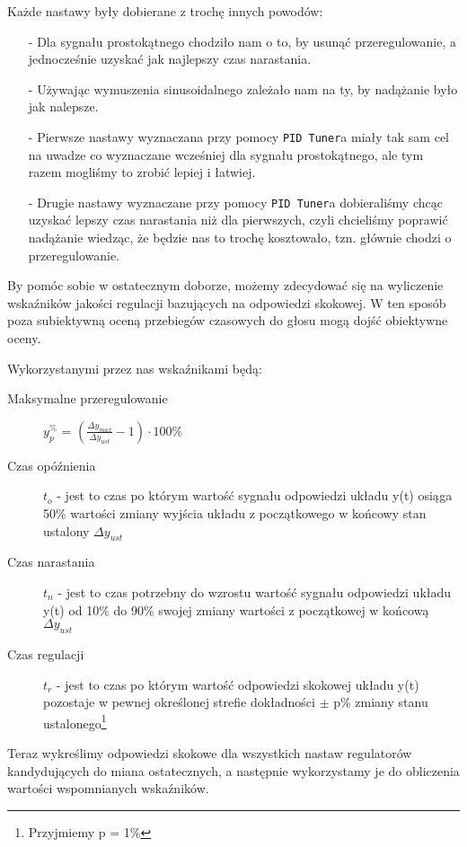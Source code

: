 \documentclass[11 pt]{article}
\begin{document}
Każde nastawy były dobierane z trochę innych powodów:

\begin{itemize}
\item[-] Dla sygnału prostokątnego chodziło nam o to, by usunąć przeregulowanie, a jednocześnie uzyskać jak najlepszy czas narastania.
\item[-] Używając wymuszenia sinusoidalnego zależało nam na ty, by nadążanie było jak nalepsze.
\item[-] Pierwsze nastawy wyznaczana przy pomocy \texttt{PID Tuner}a miały tak sam cel na uwadze co wyznaczane wcześniej dla sygnału prostokątnego, ale tym razem mogliśmy to zrobić lepiej i łatwiej.
\item[-] Drugie nastawy wyznaczane przy pomocy \texttt{PID Tuner}a dobieraliśmy chcąc uzyskać lepszy czas narastania niż dla pierwszych, czyli chcieliśmy poprawić nadążanie wiedząc, że będzie nas to trochę kosztowało, tzn. głównie chodzi o przeregulowanie.
\end{itemize}

By pomóc sobie w ostatecznym doborze, możemy zdecydować się na wyliczenie wskaźników jakości regulacji bazujących na odpowiedzi skokowej. W ten sposób poza subiektywną oceną przebiegów czasowych do głosu mogą dojść obiektywne oceny.

Wykorzystanymi przez nas wskaźnikami będą:

\begin{description}
\item[Maksymalne przeregulowanie] $y_p^{\%}$ = $\left( \frac{\Delta y_{max}}{\Delta y_{ust}} - 1 \right) \cdot 100 \%$
\item[Czas opóźnienia] $t_o$ - jest to czas po którym wartość sygnału odpowiedzi układu y(t) osiąga 50\% wartości
zmiany wyjścia układu z początkowego w końcowy stan ustalony $\Delta y_{ust}$
\item[Czas narastania] $t_n$ - jest to czas potrzebny do wzrostu wartość sygnału odpowiedzi układu y(t) od 10\%
do 90\% swojej zmiany wartości z początkowej w końcową $\Delta y_{ust}$
\item[Czas regulacji] $t_r$ - jest to czas po którym wartość odpowiedzi skokowej układu y(t) pozostaje w pewnej
określonej strefie dokładności $\pm$ p\% zmiany stanu ustalonego\footnote{Przyjmiemy p = 1\%}
\end{description}

Teraz wykreślimy odpowiedzi skokowe dla wszystkich nastaw regulatorów kandydujących do miana ostatecznych, a następnie wykorzystamy je do obliczenia wartości wspomnianych wskaźników.
\end{document}
